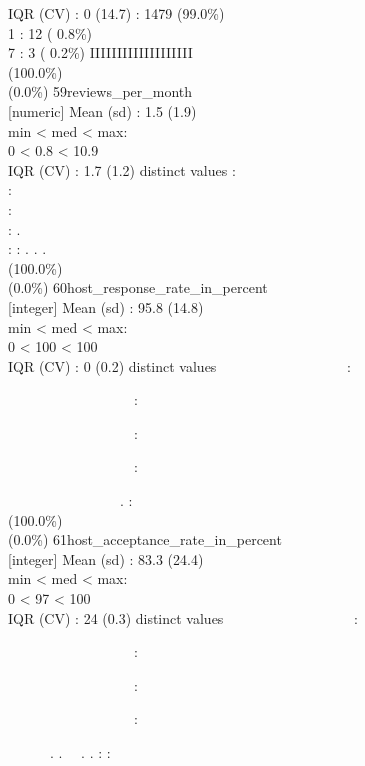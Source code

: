 \documentclass[
  journal,
]{IEEEtran}%
\begin{document}
IQR (CV) : 0 (14.7)  : 1479 (99.0\%)\\
1 : 12 ( 0.8\%)\\
7 : 3 ( 0.2\%) \textbar{} \textbar IIIIIIIIIIIIIIIIIII ~ ~
\\
(100.0\%) \\
(0.0\%) \textbar{} \textbar{} 59\textbar reviews\_per\_month\\
{[}numeric{]} \textbar Mean (sd) : 1.5 (1.9)\\
min \textless{} med \textless{} max:\\
0 \textless{} 0.8 \textless{} 10.9\\
IQR (CV) : 1.7 (1.2)  distinct values \textbar{} \textbar:\\
:\\
:\\
: .\\
: : . . . \\
(100.0\%) \\
(0.0\%) \textbar{} \textbar{}
60\textbar host\_response\_rate\_in\_percent\\
{[}integer{]} \textbar Mean (sd) : 95.8 (14.8)\\
min \textless{} med \textless{} max:\\
0 \textless{} 100 \textless{} 100\\
IQR (CV) : 0 (0.2)  distinct values \textbar{}
\textbar~~~~~~~~~~~~~~~~~~:\\
\strut ~~~~~~~~~~~~~~~~~~:\\
\strut ~~~~~~~~~~~~~~~~~~:\\
\strut ~~~~~~~~~~~~~~~~~~:\\
\strut ~~~~~~~~~~~~~~~~. : \\
(100.0\%) \\
(0.0\%) \textbar{} \textbar{}
61\textbar host\_acceptance\_rate\_in\_percent\\
{[}integer{]} \textbar Mean (sd) : 83.3 (24.4)\\
min \textless{} med \textless{} max:\\
0 \textless{} 97 \textless{} 100\\
IQR (CV) : 24 (0.3)  distinct values \textbar{}
\textbar~~~~~~~~~~~~~~~~~~:\\
\strut ~~~~~~~~~~~~~~~~~~:\\
\strut ~~~~~~~~~~~~~~~~~~:\\
\strut ~~~~~~~~~~~~~~~~~~:\\
\strut ~~~~~~. . ~~. . : : \\
\end{document}
